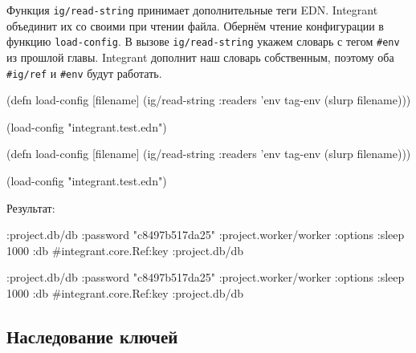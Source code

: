 \fi

Функция \verb|ig/read-string| принимает дополнительные теги EDN. Integrant
объединит их со своими при чтении файла. Обернём чтение конфигурации в функцию
\verb|load-config|. В вызове \verb|ig/read-string| укажем словарь с тегом
\verb|#env| из прошлой главы. Integrant дополнит наш словарь собственным,
поэтому оба \verb|#ig/ref| и \verb|#env| будут работать.

\ifnarrow

\begin{english}
  \begin{clojure}
(defn load-config [filename]
  (ig/read-string
    {:readers {'env tag-env}}
    (slurp filename)))

(load-config "integrant.test.edn")
  \end{clojure}
\end{english}

\else

\begin{english}
  \begin{clojure}
(defn load-config [filename]
  (ig/read-string {:readers {'env tag-env}}
                  (slurp filename)))

(load-config "integrant.test.edn")
  \end{clojure}
\end{english}

\fi

\noindent
Результат:

\ifnarrow

\begin{english}
  \begin{clojure}
{:project.db/db
 {:password "c8497b517da25"}
 :project.worker/worker
 {:options {:sleep 1000}
  :db
  #integrant.core.Ref{:key
                      :project.db/db}}}
  \end{clojure}
\end{english}

\else

\begin{english}
  \begin{clojure}
{:project.db/db {:password "c8497b517da25"}
 :project.worker/worker
 {:options {:sleep 1000}
  :db #integrant.core.Ref{:key :project.db/db}}}
  \end{clojure}
\end{english}

\fi

\subsection{Наследование ключей}


